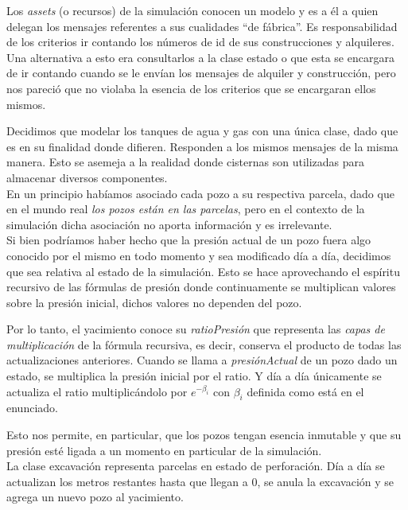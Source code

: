 Los \emph{assets} (o recursos) de la simulación conocen un modelo y es a él a quien delegan los mensajes referentes a sus cualidades ``de fábrica''. Es responsabilidad de los criterios ir contando los números de id de sus construcciones y alquileres. Una alternativa a esto era consultarlos a la clase estado o que esta se encargara de ir contando cuando se le envían los mensajes de alquiler y construcción, pero nos pareció que no violaba la esencia de los criterios que se encargaran ellos mismos. 

Decidimos que modelar los tanques de agua y gas con una única clase, dado que es en su finalidad donde difieren. Responden a los mismos mensajes de la misma manera. Esto se asemeja a la realidad donde cisternas son utilizadas para almacenar diversos componentes.
\\

En un principio habíamos asociado cada pozo a su respectiva parcela, dado que en el mundo real \emph{los pozos están en las parcelas}, pero en el contexto de la simulación dicha asociación no aporta información y es irrelevante.
\\

Si bien podríamos haber hecho que la presión actual de un pozo fuera algo conocido por el mismo en todo momento y sea modificado día a día, decidimos que sea relativa al estado de la simulación. Esto se hace aprovechando el espíritu recursivo de las fórmulas de presión donde continuamente se multiplican valores sobre la presión inicial, dichos valores no dependen del pozo. 

Por lo tanto, el yacimiento conoce su \emph{ratioPresión} que representa las \emph{capas de multiplicación} de la fórmula recursiva, es decir, conserva el producto de todas las actualizaciones anteriores. Cuando se llama a \emph{presiónActual} de un pozo dado un estado, se multiplica la presión inicial por el ratio. Y día a día únicamente se actualiza el ratio multiplicándolo por $e^{-\beta_i}$ con $\beta_i$ definida como está en el enunciado.

Esto nos permite, en particular, que los pozos tengan esencia inmutable y que su presión esté ligada a un momento en particular de la simulación.
\\

La clase excavación representa parcelas en estado de perforación. Día  a día se actualizan los metros restantes hasta que llegan a 0, se anula la excavación y se agrega un nuevo pozo al yacimiento.
\\

